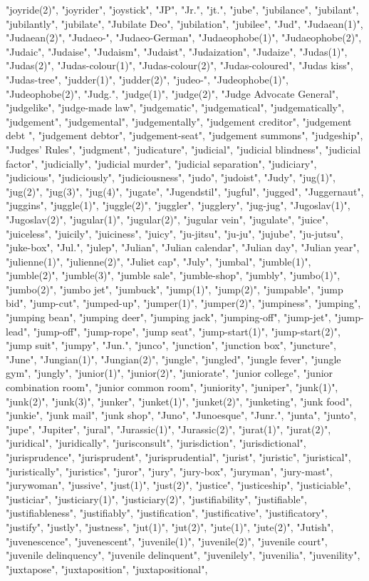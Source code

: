 "joyride(2)",
"joyrider",
"joystick",
"JP",
"Jr.",
"jt.",
"jube",
"jubilance",
"jubilant",
"jubilantly",
"jubilate",
"Jubilate Deo",
"jubilation",
"jubilee",
"Jud",
"Judaean(1)",
"Judaean(2)",
"Judaeo-",
"Judaeo-German",
"Judaeophobe(1)",
"Judaeophobe(2)",
"Judaic",
"Judaise",
"Judaism",
"Judaist",
"Judaization",
"Judaize",
"Judas(1)",
"Judas(2)",
"Judas-colour(1)",
"Judas-colour(2)",
"Judas-coloured",
"Judas kiss",
"Judas-tree",
"judder(1)",
"judder(2)",
"judeo-",
"Judeophobe(1)",
"Judeophobe(2)",
"Judg.",
"judge(1)",
"judge(2)",
"Judge Advocate General",
"judgelike",
"judge-made law",
"judgematic",
"judgematical",
"judgematically",
"judgement",
"judgemental",
"judgementally",
"judgement creditor",
"judgement debt ",
"judgement debtor",
"judgement-seat",
"judgement summons",
"judgeship",
"Judges' Rules",
"judgment",
"judicature",
"judicial",
"judicial blindness",
"judicial factor",
"judicially",
"judicial murder",
"judicial separation",
"judiciary",
"judicious",
"judiciously",
"judiciousness",
"judo",
"judoist",
"Judy",
"jug(1)",
"jug(2)",
"jug(3)",
"jug(4)",
"jugate",
"Jugendstil",
"jugful",
"jugged",
"Juggernaut",
"juggins",
"juggle(1)",
"juggle(2)",
"juggler",
"jugglery",
"jug-jug",
"Jugoslav(1)",
"Jugoslav(2)",
"jugular(1)",
"jugular(2)",
"jugular vein",
"jugulate",
"juice",
"juiceless",
"juicily",
"juiciness",
"juicy",
"ju-jitsu",
"ju-ju",
"jujube",
"ju-jutsu",
"juke-box",
"Jul.",
"julep",
"Julian",
"Julian calendar",
"Julian day",
"Julian year",
"julienne(1)",
"julienne(2)",
"Juliet cap",
"July",
"jumbal",
"jumble(1)",
"jumble(2)",
"jumble(3)",
"jumble sale",
"jumble-shop",
"jumbly",
"jumbo(1)",
"jumbo(2)",
"jumbo jet",
"jumbuck",
"jump(1)",
"jump(2)",
"jumpable",
"jump bid",
"jump-cut",
"jumped-up",
"jumper(1)",
"jumper(2)",
"jumpiness",
"jumping",
"jumping bean",
"jumping deer",
"jumping jack",
"jumping-off",
"jump-jet",
"jump-lead",
"jump-off",
"jump-rope",
"jump seat",
"jump-start(1)",
"jump-start(2)",
"jump suit",
"jumpy",
"Jun.",
"junco",
"junction",
"junction box",
"juncture",
"June",
"Jungian(1)",
"Jungian(2)",
"jungle",
"jungled",
"jungle fever",
"jungle gym",
"jungly",
"junior(1)",
"junior(2)",
"juniorate",
"junior college",
"junior combination room",
"junior common room",
"juniority",
"juniper",
"junk(1)",
"junk(2)",
"junk(3)",
"junker",
"junket(1)",
"junket(2)",
"junketing",
"junk food",
"junkie",
"junk mail",
"junk shop",
"Juno",
"Junoesque",
"Junr.",
"junta",
"junto",
"jupe",
"Jupiter",
"jural",
"Jurassic(1)",
"Jurassic(2)",
"jurat(1)",
"jurat(2)",
"juridical",
"juridically",
"jurisconsult",
"jurisdiction",
"jurisdictional",
"jurisprudence",
"jurisprudent",
"jurisprudential",
"jurist",
"juristic",
"juristical",
"juristically",
"juristics",
"juror",
"jury",
"jury-box",
"juryman",
"jury-mast",
"jurywoman",
"jussive",
"just(1)",
"just(2)",
"justice",
"justiceship",
"justiciable",
"justiciar",
"justiciary(1)",
"justiciary(2)",
"justifiability",
"justifiable",
"justifiableness",
"justifiably",
"justification",
"justificative",
"justificatory",
"justify",
"justly",
"justness",
"jut(1)",
"jut(2)",
"jute(1)",
"jute(2)",
"Jutish",
"juvenescence",
"juvenescent",
"juvenile(1)",
"juvenile(2)",
"juvenile court",
"juvenile delinquency",
"juvenile delinquent",
"juvenilely",
"juvenilia",
"juvenility",
"juxtapose",
"juxtaposition",
"juxtapositional",
